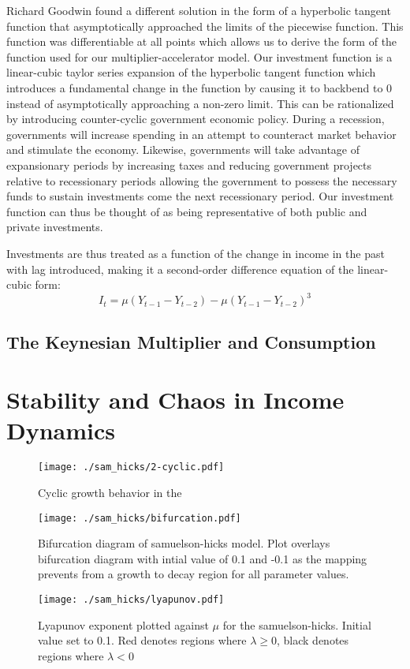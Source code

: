 Richard Goodwin found a different solution in the form of a hyperbolic tangent function that asymptotically approached the limits of the piecewise function. This function was differentiable at all points which allows us to derive the form of the function used for our multiplier-accelerator model. Our investment function is a linear-cubic taylor series expansion of the hyperbolic tangent function which introduces a fundamental change in the function by causing it to backbend to 0 instead of asymptotically approaching a non-zero limit. This can be rationalized by introducing counter-cyclic government economic policy. During a recession, governments will increase spending in an attempt to counteract market behavior and stimulate the economy. Likewise, governments will take advantage of expansionary periods by increasing taxes and reducing government projects relative to recessionary periods allowing the government to possess the necessary funds to sustain investments come the next recessionary period. Our investment function can thus be thought of as being representative of both public and private investments.\autocite{Puu2003}

Investments are thus treated as a function of the change in income in the past with lag introduced, making it a second-order difference equation of the linear-cubic form:
\begin{equation}
    I_t=\mu(Y_{t-1}-Y_{t-2})-\mu(Y_{t-1}-Y_{t-2})^3
\end{equation}
\subsection{The Keynesian Multiplier and Consumption}
\section{Stability and Chaos in Income Dynamics}

\begin{figure}
    \centering
    \texttt{[image: ./sam\_hicks/2-cyclic.pdf]}
    \caption{Cyclic growth behavior in the }
\end{figure}
\begin{figure}
    \centering
    \texttt{[image: ./sam\_hicks/bifurcation.pdf]}
    \caption{Bifurcation diagram of samuelson-hicks model. Plot overlays bifurcation diagram with intial value of 0.1 and -0.1 as the mapping prevents from a growth to decay region for all parameter values.}
\end{figure}
\begin{figure}
    \centering
    \texttt{[image: ./sam\_hicks/lyapunov.pdf]}
    \caption{Lyapunov exponent plotted against $\mu$ for the samuelson-hicks. Initial value set to 0.1. Red denotes regions where $\lambda\geq0$, black denotes regions where $\lambda<0$}
\end{figure}